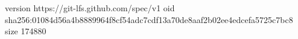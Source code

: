 version https://git-lfs.github.com/spec/v1
oid sha256:01084d56a4b8889964f8cf54adc7cdf13a70de8aaf2b02ee4edcefa5725c7bc8
size 174880
